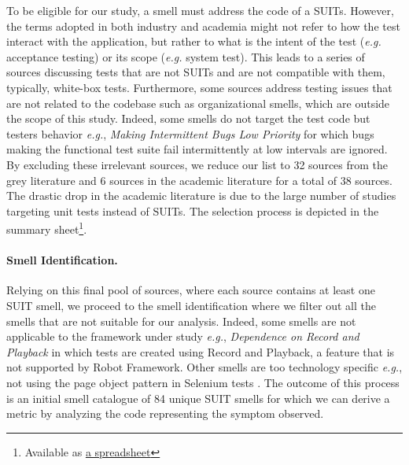 To be eligible for our study, a smell must address the code of a SUITs. However, the terms adopted in both industry and academia might not refer to how the test interact with the application, but rather to what is the intent of the test (\emph{e.g.} acceptance testing) or its scope (\emph{e.g.} system test). This leads to a series of sources discussing tests that are not SUITs and are not compatible with them, typically, white-box tests. Furthermore, some sources address testing issues that are not related to the codebase such as organizational smells, which are outside the scope of this study. Indeed, some smells do not target the test code but testers behavior \emph{e.g.}, \emph{Making Intermittent Bugs Low Priority} \cite{StackExchange2017} for which bugs making the functional test suite fail intermittently at low intervals are ignored. By excluding these irrelevant sources, we reduce our list to 32 sources from the grey literature and 6 sources in the academic literature for a total of 38 sources. The drastic drop in the academic literature is due to the large number of studies targeting unit tests instead of SUITs.
The selection process is depicted in the summary sheet\footnote{Available as \href{https://docs.google.com/spreadsheets/d/e/2PACX-1vQ78jmOjU3qTOlGzwCSkidJOliPKNDQhmuOxSsfTaRqFVjmFP41JUbYQeupqU_lGCK6L4EpQ3FHNGhU/pubhtml}{a spreadsheet}}.

\paragraph{\textbf{Smell Identification.}}

Relying on this final pool of sources, where each source contains at least one SUIT smell, we proceed to the smell identification where we filter out all the smells that are not suitable for our analysis. Indeed, some smells are not applicable to the framework under study \emph{e.g.}, \emph{Dependence on Record and Playback} \cite{StackExchange2017} in which tests are created using Record and Playback, a feature that is not supported by Robot Framework. Other smells are too technology specific \emph{e.g.}, not using the page object pattern in Selenium tests \cite{Advolodkin2018}. The outcome of this process is an initial smell catalogue of 84 unique SUIT smells for which we can derive a metric by analyzing the code representing the symptom observed.

